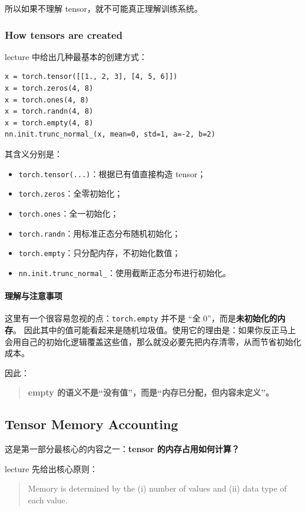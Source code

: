 \documentclass[a4paper,UTF8]{article}
\numberwithin{equation}{section}
\begin{document}
所以如果不理解 tensor，就不可能真正理解训练系统。

\subsubsection{How tensors are created}

lecture 中给出几种最基本的创建方式：
\begin{verbatim}
x = torch.tensor([[1., 2, 3], [4, 5, 6]])
x = torch.zeros(4, 8)
x = torch.ones(4, 8)
x = torch.randn(4, 8)
x = torch.empty(4, 8)
nn.init.trunc_normal_(x, mean=0, std=1, a=-2, b=2)
\end{verbatim}

其含义分别是：
\begin{itemize}
    \item \verb|torch.tensor(...)|：根据已有值直接构造 tensor；
    \item \verb|torch.zeros|：全零初始化；
    \item \verb|torch.ones|：全一初始化；
    \item \verb|torch.randn|：用标准正态分布随机初始化；
    \item \verb|torch.empty|：只分配内存，不初始化数值；
    \item \verb|nn.init.trunc_normal_|：使用截断正态分布进行初始化。
\end{itemize}

\paragraph{理解与注意事项}
这里有一个很容易忽视的点：\verb|torch.empty| 并不是 ``全 0''，而是\textbf{未初始化的内存}。  
因此其中的值可能看起来是随机垃圾值。使用它的理由是：如果你反正马上会用自己的初始化逻辑覆盖这些值，那么就没必要先把内存清零，从而节省初始化成本。

因此：
\begin{quote}
\textbf{empty 的语义不是“没有值”，而是“内存已分配，但内容未定义”。}
\end{quote}

\subsection{Tensor Memory Accounting}

这是第一部分最核心的内容之一：\textbf{tensor 的内存占用如何计算？}

lecture 先给出核心原则：
\begin{quote}
Memory is determined by the (i) number of values and (ii) data type of each value.
\end{quote}
\end{document}
